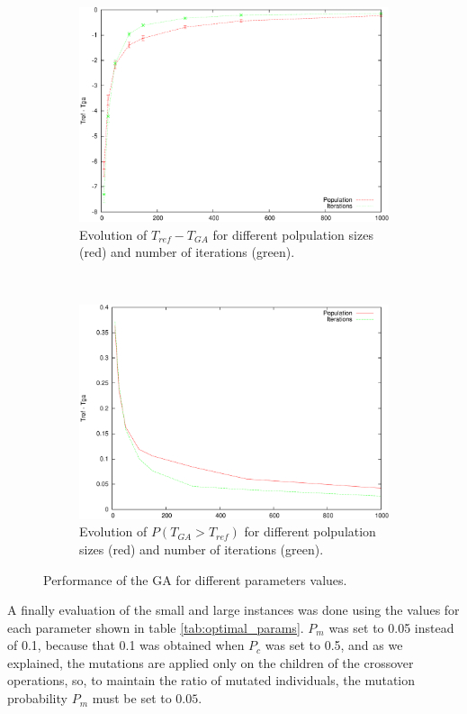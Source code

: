 \documentclass[10pt,a4paper]{article}
\begin{document}
\begin{figure}[h]
\begin{subfigure}[b]{0.45\textwidth}
\includegraphics[width=\textwidth]{results_pop_it_diff.pdf}
\caption{Evolution of $T_{ref}-T_{GA}$ for different polpulation sizes (red) and number of iterations (green).}
\label{fig:evol_pop_it_diff}
\end{subfigure}
~
\begin{subfigure}[b]{0.45\textwidth}
\centering
\includegraphics[width=\textwidth]{results_pop_it_worse.pdf}
\caption{Evolution of $P(T_{GA} > T_{ref})$ for different polpulation sizes (red) and number of iterations (green).}
\label{fig:evol_pop_it_worse}
\end{subfigure}
\caption{Performance of the GA for different parameters values.}
\end{figure}

A finally evaluation of the small and large instances was done using the values for each parameter shown in table \ref{tab:optimal_params}. $P_m$ was set to 0.05 instead of 0.1, because that 0.1 was obtained when $P_c$ was set to 0.5, and as we explained, the mutations are applied only on the children of the crossover operations, so, to maintain the ratio of mutated individuals, the mutation probability $P_m$ must be set to $0.05$.\\
\end{document}
